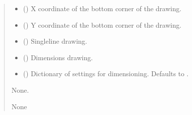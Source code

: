 \documentclass[a4paper,10pt,english]{sphinxmanual}
\begin{document}
\begin{fulllineitems}
\begin{fulllineitems}
\begin{quote}
\begin{description}
\begin{itemize}
\item {} 
\sphinxAtStartPar
{} () \textendash{} X coordinate of the bottom corner of the drawing.

\item {} 
\sphinxAtStartPar
{} () \textendash{} Y coordinate of the bottom corner of the drawing.

\item {} 
\sphinxAtStartPar
{} () \textendash{} Single\sphinxhyphen{}line drawing.

\item {} 
\sphinxAtStartPar
{} () \textendash{} Dimensions drawing.

\item {} 
\sphinxAtStartPar
{} (\sphinxstyleliteralemphasis{\sphinxupquote{, }}) \textendash{} Dictionary of settings for dimensioning. Defaults to .

\end{itemize}

\sphinxAtStartPar
None.

\sphinxAtStartPar
None

\end{description}\end{quote}

\end{fulllineitems}



\end{fulllineitems}
\end{document}
